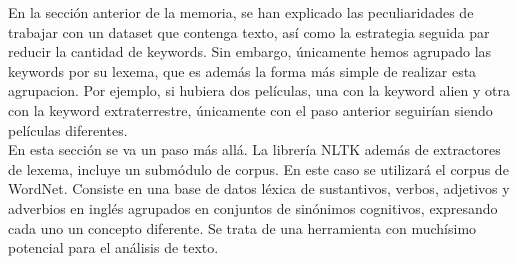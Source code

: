 En la sección anterior de la memoria, se han explicado las peculiaridades de trabajar con un dataset que contenga texto, así como la estrategia seguida par reducir la cantidad de keywords. Sin embargo, únicamente hemos agrupado las keywords por su lexema, que es además la forma más simple de realizar esta agrupacion. Por ejemplo, si hubiera dos películas, una con la keyword alien y otra con la keyword extraterrestre, únicamente con el paso anterior seguirían siendo películas diferentes.\\

En esta sección se va un paso más allá. La librería NLTK además de extractores de lexema, incluye un submódulo de corpus. En este caso se utilizará el corpus de WordNet. Consiste en una base de datos léxica de sustantivos, verbos, adjetivos y adverbios en inglés agrupados en conjuntos de sinónimos cognitivos, expresando cada uno un concepto diferente. Se trata de una herramienta con muchísimo potencial para el análisis de texto.\\

